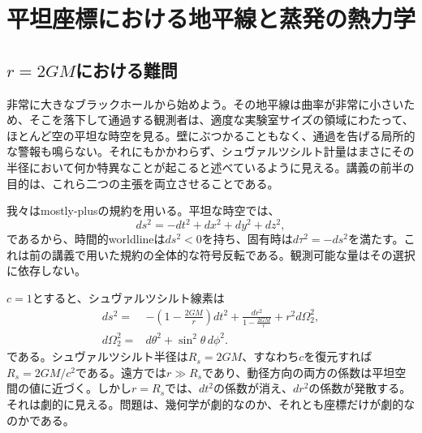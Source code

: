 \chapter{平坦座標における地平線と蒸発の熱力学}


\section{\texorpdfstring{\(r=2GM\)}{r=2GM}における難問}

非常に大きなブラックホールから始めよう。その地平線は曲率が非常に小さいため、そこを落下して通過する観測者は、適度な実験室サイズの領域にわたって、ほとんど空の平坦な時空を見る。壁にぶつかることもなく、通過を告げる局所的な警報も鳴らない。それにもかかわらず、シュヴァルツシルト計量はまさにその半径において何か特異なことが起こると述べているように見える。講義の前半の目的は、これら二つの主張を両立させることである。

我々はmostly-plusの規約を用いる。平坦な時空では、
\begin{equation}
ds^2=-dt^2+dx^2+dy^2+dz^2,
\end{equation}
であるから、時間的worldlineは\(ds^2<0\)を持ち、固有時は\(d\tau^2=-ds^2\)を満たす。これは前の講義で用いた規約の全体的な符号反転である。観測可能な量はその選択に依存しない。

\(c=1\)とすると、シュヴァルツシルト線素は
\begin{equation}
\begin{aligned}
ds^2={}&-\left(1-\frac{2GM}{r}\right)dt^2
+\frac{dr^2}{1-\frac{2GM}{r}}
+r^2d\Omega_2^2,\\
d\Omega_2^2={}&d\theta^2+\sin^2\theta\,d\phi^2 .
\end{aligned}
\label{eq:l03-schwarzschild}
\end{equation}
である。シュヴァルツシルト半径は\(R_s=2GM\)、すなわち\(c\)を復元すれば\(R_s=2GM/c^2\)である。遠方では\(r\gg R_s\)であり、動径方向の両方の係数は平坦空間の値に近づく。しかし\(r=R_s\)では、\(dt^2\)の係数が消え、\(dr^2\)の係数が発散する。それは劇的に見える。問題は、幾何学が劇的なのか、それとも座標だけが劇的なのかである。


